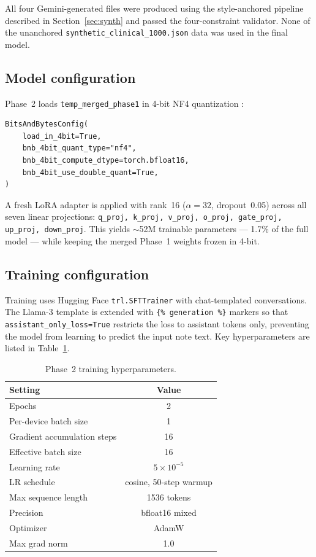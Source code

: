 \documentclass[11pt,a4paper]{article}
\begin{document}
\noindent All four Gemini-generated files were produced using the style-anchored pipeline described in Section~\ref{sec:synth} and passed the four-constraint validator. None of the unanchored \texttt{synthetic\_clinical\_1000.json} data was used in the final model.

\subsection{Model configuration}

Phase~2 loads \texttt{temp\_merged\_phase1} in 4-bit NF4 quantization \cite{dettmers2023qlora}:

\begin{lstlisting}
BitsAndBytesConfig(
    load_in_4bit=True,
    bnb_4bit_quant_type="nf4",
    bnb_4bit_compute_dtype=torch.bfloat16,
    bnb_4bit_use_double_quant=True,
)
\end{lstlisting}

A fresh LoRA adapter is applied with rank~16 ($\alpha = 32$, dropout~0.05) across all seven linear projections: \texttt{q\_proj, k\_proj, v\_proj, o\_proj, gate\_proj, up\_proj, down\_proj}. This yields $\sim$52M trainable parameters — 1.7\% of the full model — while keeping the merged Phase~1 weights frozen in 4-bit.

\subsection{Training configuration}

Training uses Hugging Face \texttt{trl.SFTTrainer} with chat-templated conversations. The Llama-3 template is extended with \texttt{\{\% generation \%\}} markers so that \texttt{assistant\_only\_loss=True} restricts the loss to assistant tokens only, preventing the model from learning to predict the input note text. Key hyperparameters are listed in Table~\ref{tab:hyperparams}.

\begin{table}[h]
\centering
\caption{Phase~2 training hyperparameters.}
\label{tab:hyperparams}
\begin{tabular}{lc}
\toprule
Setting & Value \\
\midrule
Epochs & 2 \\
Per-device batch size & 1 \\
Gradient accumulation steps & 16 \\
Effective batch size & 16 \\
Learning rate & $5 \times 10^{-5}$ \\
LR schedule & cosine, 50-step warmup \\
Max sequence length & 1536 tokens \\
Precision & bfloat16 mixed \\
Optimizer & AdamW \\
Max grad norm & 1.0 \\
\bottomrule
\end{tabular}
\end{table}
\end{document}
